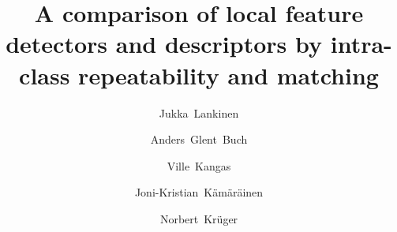 \documentclass[preprint,authoryear,review]{elsarticle}
\begin{document}
\linenumbers

\begin{frontmatter}



\title{A comparison of local feature detectors and descriptors by intra-class repeatability and matching}


\author[addrlutk]{Jukka~Lankinen}
\author[addrcovil]{Anders~Glent~Buch}
\author[addrlutk]{Ville~Kangas}
\author[addrtut]{Joni-Kristian~K\"am\"ar\"ainen}
\author[addrcovil]{Norbert~Kr\"uger}


%
\address[addrlutk]{Lappeenranta University of Technology (LUT), LUT Kouvola, Finland}%
\address[addrcovil]{M{\ae}rsk McKinney M{\o}ller Institute, University of Southern Denmark, Denmark}%
\address[addrtut]{Department of Signal Processing, Tampere University of Technology, Finland}



\end{frontmatter}
\end{document}
